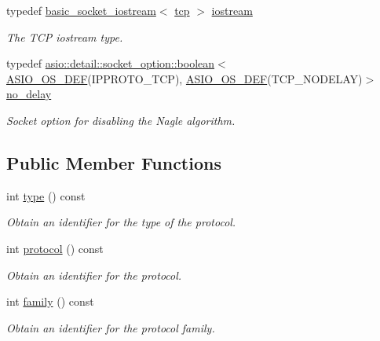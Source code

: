 \begin{DoxyCompactItemize}
typedef \hyperlink{classasio_1_1basic__socket__iostream}{basic\+\_\+socket\+\_\+iostream}$<$ \hyperlink{classasio_1_1ip_1_1tcp}{tcp} $>$ \hyperlink{classasio_1_1ip_1_1tcp_a80eba1234024033d7a8bc5c6eee35a1b}{iostream}
\begin{DoxyCompactList}\small\item\em The T\+C\+P iostream type. \end{DoxyCompactList}\item 
typedef \hyperlink{classasio_1_1detail_1_1socket__option_1_1boolean}{asio\+::detail\+::socket\+\_\+option\+::boolean}$<$ \hyperlink{socket__types_8hpp_a26e0208fa086ac48cf5af1b2a521c74a}{A\+S\+I\+O\+\_\+\+O\+S\+\_\+\+D\+E\+F}(I\+P\+P\+R\+O\+T\+O\+\_\+\+T\+C\+P), \hyperlink{socket__types_8hpp_a26e0208fa086ac48cf5af1b2a521c74a}{A\+S\+I\+O\+\_\+\+O\+S\+\_\+\+D\+E\+F}(T\+C\+P\+\_\+\+N\+O\+D\+E\+L\+A\+Y)$>$ \hyperlink{classasio_1_1ip_1_1tcp_a9a35d1c7bb67c0ec1481336cfa826c2e}{no\+\_\+delay}
\begin{DoxyCompactList}\small\item\em Socket option for disabling the Nagle algorithm. \end{DoxyCompactList}\end{DoxyCompactItemize}
\subsection*{Public Member Functions}
\begin{DoxyCompactItemize}
\item 
int \hyperlink{classasio_1_1ip_1_1tcp_a5a1f1ad2e781535a274a49016342d184}{type} () const 
\begin{DoxyCompactList}\small\item\em Obtain an identifier for the type of the protocol. \end{DoxyCompactList}\item 
int \hyperlink{classasio_1_1ip_1_1tcp_abe12331d556fe17eaa40f1f458133496}{protocol} () const 
\begin{DoxyCompactList}\small\item\em Obtain an identifier for the protocol. \end{DoxyCompactList}\item 
int \hyperlink{classasio_1_1ip_1_1tcp_aa6dda317994dc01071da5f2412ef60de}{family} () const 
\begin{DoxyCompactList}\small\item\em Obtain an identifier for the protocol family. \end{DoxyCompactList}\end{DoxyCompactItemize}
